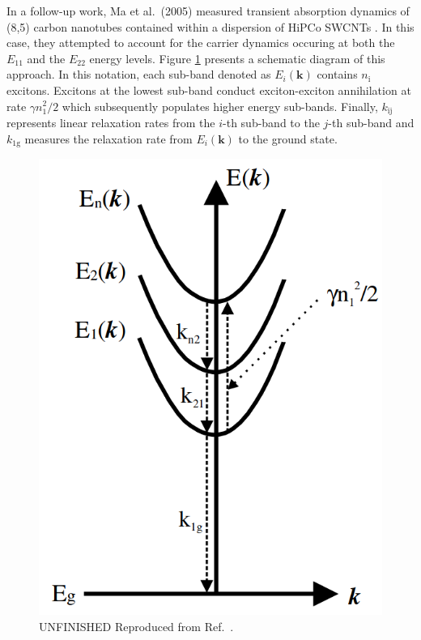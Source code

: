 In a follow-up work, Ma et al.\ (2005) measured transient absorption dynamics of (8,5) carbon nanotubes contained within a dispersion of HiPCo SWCNTs \cite{ma2005femtosecond}. In this case, they attempted to account for the carrier dynamics occuring at both the $E_{11}$ and the $E_{22}$ energy levels. Figure \ref{fig:exciton_schematic_ma} presents a schematic diagram of this approach. In this notation, each sub-band denoted as $E_i(\mathbf{k})$ contains $n_\text{i}$ excitons. Excitons at the lowest sub-band conduct exciton-exciton annihilation at rate $\gamma n_1^2/2$ which subsequently populates higher energy sub-bands. Finally, $k_\text{ij}$ represents linear relaxation rates from the $i$-th sub-band to the $j$-th sub-band and $k_\text{1g}$ measures the relaxation rate from $E_i(\mathbf{k})$ to the ground state.

\begin{figure}[ht]
	\centering
	\includegraphics[scale=0.3]{images/chapter_prior_works/exciton_schematic_ma_2005}
	\caption{{\color{red} UNFINISHED} Reproduced from Ref.\ \cite{ma2005femtosecond}.}
	\label{fig:exciton_schematic_ma}
\end{figure}

